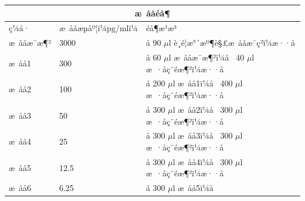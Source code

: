 \documentclass[UTF8,10pt,a4paper,fontset=fandol]{ctexart}
\newcommand{\fieldvalue}[1]{#1}
\newcommand{\handwritten}[1]{#1}
\begin{document}
\begin{tabularx}{\textwidth}{|p{2.5cm}|p{2.5cm}|X|}
\hline
\multicolumn{3}{|c|}{æ ååéå¶} \\
\hline
ç¼å· & æ ååæµåº¦ï¼pg/mlï¼ & éå¶æ¹æ³ \\
\hline
æ ååæ¯æ¶² & 3000 &
å
\fieldvalue{\handwritten{90}} $\mu$l è¸é¦æ°´æº¶è§£æ ååæ¯ç²ï¼æ··å \\
\hline
æ åå1 & 300 &
å
\fieldvalue{\handwritten{60}} $\mu$l æ ååæ¯æ¶²ï¼å 
\fieldvalue{\handwritten{40}} $\mu$l æ ·åç¨éæ¶²ï¼æ··å \\
\hline
æ åå2 & 100 &
å
\fieldvalue{\handwritten{200}} $\mu$l æ åå1ï¼å 
\fieldvalue{\handwritten{400}} $\mu$l æ ·åç¨éæ¶²ï¼æ··å \\
\hline
æ åå3 & 50 &
å
\fieldvalue{\handwritten{300}} $\mu$l æ åå2ï¼å 
\fieldvalue{\handwritten{300}} $\mu$l æ ·åç¨éæ¶²ï¼æ··å \\
\hline
æ åå4 & 25 &
å
\fieldvalue{\handwritten{300}} $\mu$l æ åå3ï¼å 
\fieldvalue{\handwritten{300}} $\mu$l æ ·åç¨éæ¶²ï¼æ··å \\
\hline
æ åå5 & 12.5 &
å
\fieldvalue{\handwritten{300}} $\mu$l æ åå4ï¼å 
\fieldvalue{\handwritten{300}} $\mu$l æ ·åç¨éæ¶²ï¼æ··å \\
\hline
æ åå6 & 6.25 &
å
\fieldvalue{\handwritten{300}} $\mu$l æ åå5ï¼å 

\end{tabularx}
\end{document}
